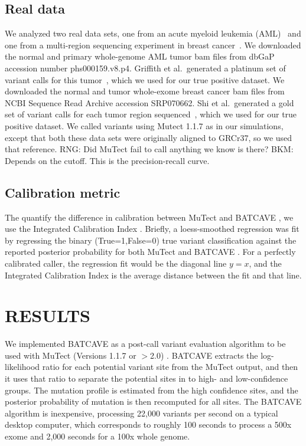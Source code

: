 \documentclass[a4,center,fleqn]{NAR}
\newcommand{\rngcomment}[1]{{\color{red}RNG: #1}}
\newcommand{\bkmcomment}[1]{{\color{blue}BKM: #1}}
\newcommand{\batcave}{BATCAVE }
\begin{document}
\subsection{Real data}
We analyzed two real data sets, one from an acute myeloid leukemia (AML)~\cite{Griffith2015} and one from a multi-region sequencing experiment in breast cancer~\cite{Shi2018}.
We downloaded the normal and primary whole-genome AML tumor bam files from dbGaP accession number phs000159.v8.p4.
Griffith et al.\ generated a platinum set of variant calls for this tumor~\cite{Griffith2015}, which we used for our true positive dataset.
We downloaded the normal and tumor whole-exome breast cancer bam files from NCBI Sequence Read Archive accession SRP070662.
Shi et al.\ generated a gold set of variant calls for each tumor region sequenced~\cite{Shi2018}, which we used for our true positive dataset.
We called variants using Mutect 1.1.7 as in our simulations, except that both these data sets were originally aligned to GRCr37, so we used that reference.
\rngcomment{Did MuTect fail to call anything we know is there?}
\bkmcomment{Depends on the cutoff. This is the precision-recall curve.}

\subsection{Calibration metric}
The quantify the difference in calibration between MuTect and \batcave, we use the Integrated Calibration Index \cite{Austin2019}.
Briefly, a loess-smoothed regression was fit by regressing the binary (True=1,False=0) true variant classification against the reported posterior probability for both MuTect and \batcave.
For a perfectly calibrated caller, the regression fit would be the diagonal line $y=x$, and the Integrated Calibration Index is the average distance between the fit and that line.


\section{RESULTS}
We implemented \batcave as a post-call variant evaluation algorithm to be used with MuTect (Versions 1.1.7 or $>$2.0) \cite{Cibulskis2013}.
\batcave extracts the log-likelihood ratio for each potential variant site from the MuTect output, and then it uses that ratio to separate the potential sites in to high- and low-confidence groups.
The mutation profile is estimated from the high confidence sites, and the posterior probability of mutation is then recomputed for all sites.
The \batcave algorithm is inexpensive, processing 22,000 variants per second on a typical desktop computer, which corresponds to roughly 100 seconds to process a 500x exome and 2,000 seconds for a 100x whole genome.
\end{document}

